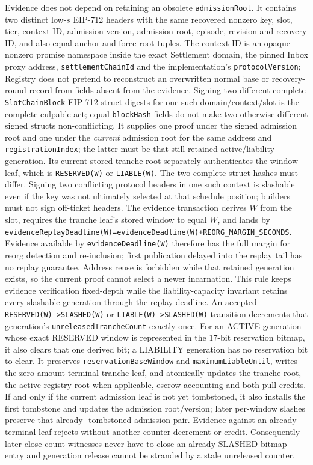 \documentclass[a4paper,11pt]{article}
\newcommand{\code}[1]{\nolinkurl{#1}}
\begin{document}
Evidence does not depend on retaining an obsolete \code{admissionRoot}.  It
contains two distinct low-$s$ EIP-712 headers with the same recovered nonzero
key, slot, tier, context ID, admission version, admission root, episode,
revision and recovery ID, and also equal anchor and force-root tuples.  The
context ID is an opaque nonzero promise namespace inside the exact Settlement
domain, the pinned Inbox proxy address, \code{settlementChainId} and the
implementation's \code{protocolVersion}; Registry does not pretend to reconstruct
an overwritten normal base or recovery-round record from fields absent from the
evidence.  Signing two different complete \code{SlotChainBlock} EIP-712 struct
digests for one such domain/context/slot is the complete culpable act; equal
\code{blockHash} fields do not make two otherwise different signed structs
non-conflicting.  It
supplies one proof under the signed admission root
and one under the \emph{current} admission root for the same address and
\code{registrationIndex}; the latter must be that still-retained
active/liability generation.  Its current stored tranche root separately
authenticates the window leaf, which is \code{RESERVED(W)} or
\code{LIABLE(W)}.  The two complete struct hashes must differ.  Signing two
conflicting protocol headers in one such context is slashable even if the key
was not ultimately selected at that schedule position; builders must not sign
off-ticket headers.  The evidence transaction derives $W$ from the slot,
requires the tranche leaf's stored window to equal $W$, and lands by
\code{evidenceReplayDeadline(W)=evidenceDeadline(W)+REORG_MARGIN_SECONDS}.
Evidence available by \code{evidenceDeadline(W)} therefore has the full margin
for reorg detection and re-inclusion; first publication delayed into the replay
tail has no replay guarantee.  Address reuse is forbidden while that retained
generation exists, so the current proof cannot select a newer incarnation.
This rule keeps evidence verification fixed-depth while the liability-capacity
invariant retains every slashable generation through the replay deadline.
An accepted \code{RESERVED(W)->SLASHED(W)} or
\code{LIABLE(W)->SLASHED(W)} transition decrements that generation's
\code{unreleasedTrancheCount} exactly once.  For an ACTIVE generation whose
exact RESERVED window is represented in the 17-bit reservation bitmap, it also
clears that one derived bit; a LIABILITY generation has no reservation bit to
clear.  It preserves \code{reservationBaseWindow} and
\code{maximumLiableUntil}, writes the zero-amount terminal tranche leaf, and
atomically updates the tranche root, the active registry root when applicable,
escrow accounting and both pull credits.  If and only if the current admission
leaf is not yet tombstoned, it also installs the first tombstone and updates the
admission root/version; later per-window slashes preserve that already-
tombstoned admission pair.  Evidence against an already terminal leaf rejects without another
counter decrement or credit.  Consequently later close-count witnesses never
have to close an already-SLASHED bitmap entry and generation release cannot be
stranded by a stale unreleased counter.
\end{document}
